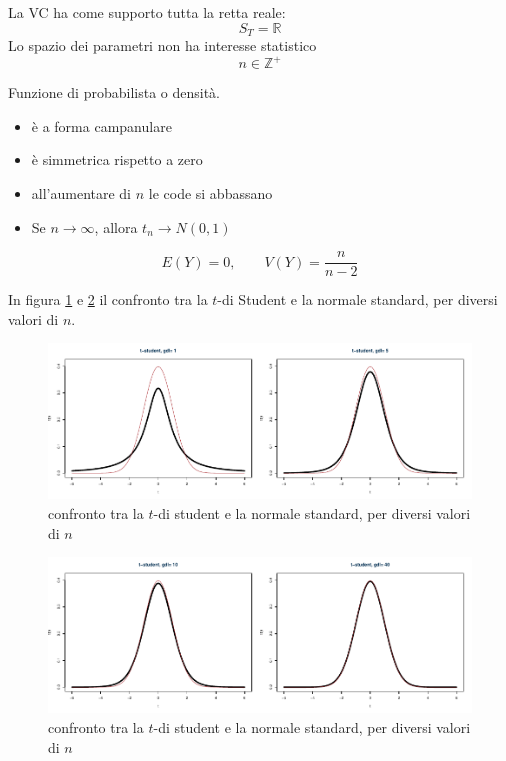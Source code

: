 \documentclass[
  11pt,
]{book}
\providecommand{\tightlist}{%
  \setlength{\itemsep}{0pt}\setlength{\parskip}{0pt}}
\theoremstyle{mytheoremstyle}
\theoremstyle{mydefstyle}
\begin{document}
\begin{info}
La VC ha come supporto tutta la retta reale:
\[S_T=\mathbb{R}\]
Lo spazio dei parametri non ha interesse statistico
\[n\in\mathbb{Z}^+\]

Funzione di probabilista o densità.

\begin{itemize}
\tightlist
\item
  è a forma campanulare
\item
  è simmetrica rispetto a zero
\item
  all'aumentare di \(n\) le code si abbassano
\item
  Se \(n\to\infty\), allora \(t_n\to N(0,1)\)
\end{itemize}

\[E(Y)=0,\qquad V(Y)=\frac{n}{n-2}\]

\end{info}

In figura \ref{fig:t-student1} e \ref{fig:t-student2} il confronto tra la \(t\)-di Student e la normale standard, per diversi valori di \(n\).

\begin{figure}[H]

{\centering \includegraphics{Appunti_di_Statistica_2025_files/figure-latex/t-student1-1} 

}

\caption{confronto tra la $t$-di student e la normale standard, per diversi valori di $n$}\label{fig:t-student1}
\end{figure}

\begin{figure}[H]

{\centering \includegraphics{Appunti_di_Statistica_2025_files/figure-latex/t-student2-1} 

}

\caption{confronto tra la $t$-di student e la normale standard, per diversi valori di $n$}\label{fig:t-student2}
\end{figure}
\end{document}
